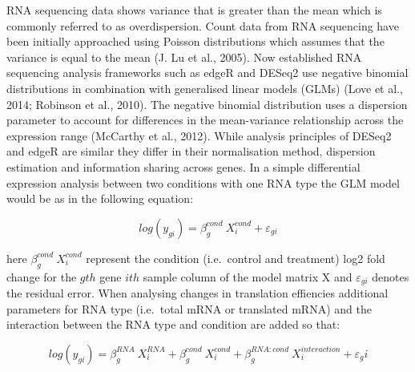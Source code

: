 \documentclass[12pt,openany]{book}
\begin{document}
RNA sequencing data shows variance that is greater than the mean which
is commonly referred to as overdispersion. Count data from RNA
sequencing have been initially approached using Poisson distributions
which assumes that the variance is equal to the mean (J. Lu et al.,
2005). Now established RNA sequencing analysis frameworks such as edgeR
and DESeq2 use negative binomial distributions in combination with
generalised linear models (GLMs) (Love et al., 2014; Robinson et al.,
2010). The negative binomial distribution uses a dispersion parameter to
account for differences in the mean-variance relationship across the
expression range (McCarthy et al., 2012). While analysis principles of
DESeq2 and edgeR are similar they differ in their normalisation method,
dispersion estimation and information sharing across genes. In a simple
differential expression analysis between two conditions with one RNA
type the GLM model would be as in the following equation:

\[log(y_{gi}) = \beta_g^{cond}\ X_i^{cond} + \varepsilon_{gi}\]

here \(\beta_g^{cond}\ X_i^{cond}\) represent the condition
(i.e.~control and treatment) log2 fold change for the \(gth\) gene
\(ith\) sample column of the model matrix X and \(\varepsilon_{gi}\)
denotes the residual error. When analysing changes in translation
effiencies additional parameters for RNA type (i.e.~total mRNA or
translated mRNA) and the interaction between the RNA type and condition
are added so that:

\[log(y_{gi}) = \beta_g^{RNA}\ X_i^{RNA}+ \beta_g^{cond}\ X_i^{cond} + \beta_g^{RNA:cond}\ X_i^{interaction} + \varepsilon_gi\]
\end{document}
